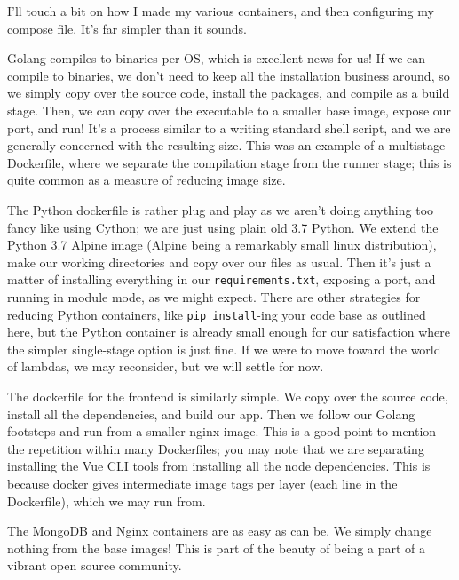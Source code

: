 \documentclass[11pt, twoside, reqno]{book}
\begin{document}
I'll touch a bit on how I made my various containers, and then configuring my compose file. It's far simpler than it sounds.

\label{Go CRUD Backend Dockerfile}

Golang compiles to binaries per OS, which is excellent news for us! If we can compile to binaries, we don't need to keep all the installation business around, so we simply copy over the source code, install the packages, and compile as a build stage. Then, we can copy over the executable to a smaller base image, expose our port, and run! It's a process similar to a writing standard shell script, and we are generally concerned with the resulting size. This was an example of a multistage Dockerfile, where we separate the compilation stage from the runner stage; this is quite common as a measure of reducing image size.

\label{Python Model Backend Dockerfile}

The Python dockerfile is rather plug and play as we aren't doing anything too fancy like using Cython; we are just using plain old 3.7 Python. We extend the Python 3.7 Alpine image (Alpine being a remarkably small linux distribution), make our working directories and copy over our files as usual. Then it's just a matter of installing everything in our \texttt{requirements.txt}, exposing a port, and running in module mode, as we might expect. There are other strategies for reducing Python containers, like \texttt{pip install}-ing your code base as outlined \href{https://pythonspeed.com/articles/multi-stage-docker-python/}{here}, but the Python container is already small enough for our satisfaction where the simpler single-stage option is just fine. If we were to move toward the world of lambdas, we may reconsider, but we will settle for now.

\label{Vue Frontend Dockerfile}

The dockerfile for the frontend is similarly simple. We copy over the source code, install all the dependencies, and build our app. Then we follow our Golang footsteps and run from a smaller nginx image. This is a good point to mention the repetition within many Dockerfiles; you may note that we are separating installing the Vue CLI tools from installing all the node dependencies. This is because docker gives intermediate image tags per layer (each line in the Dockerfile), which we may run from.

\label{Mongo and Nginx}

The MongoDB and Nginx containers are as easy as can be. We simply change nothing from the base images! This is part of the beauty of being a part of a vibrant open source community.
\end{document}
